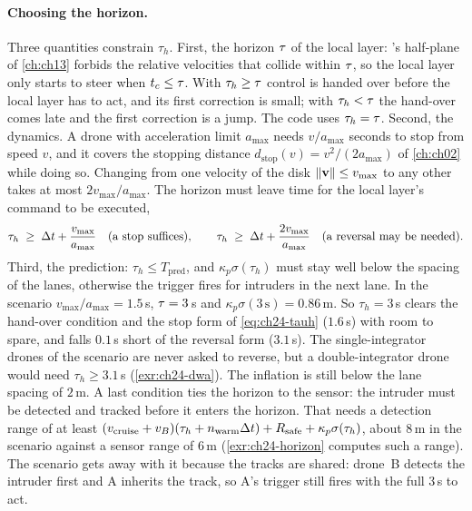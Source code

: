 \paragraph{Choosing the horizon.}
Three quantities constrain $\tau_h$. First, the horizon $\tau$ of the local
layer: \orca's half-plane of \cref{ch:ch13} forbids the relative velocities
that collide within $\tau$, so the local layer only starts to steer when
$t_c \le \tau$. With $\tau_h \ge \tau$ control is handed over before the
local layer has to act, and its first correction is small; with
$\tau_h < \tau$ the hand-over comes late and the first correction is a jump.
The code uses $\tau_h = \tau$. Second, the dynamics. A drone with
acceleration limit $a_{\max}$ needs $v/a_{\max}$ seconds to stop from speed
$v$, and it covers the stopping distance
$d_{\mathrm{stop}}(v) = v^2/(2a_{\max})$ of \cref{ch:ch02} while doing so.
Changing from one velocity of the disk
$\left\lVert \mathbf{v} \right\rVert \le v_{\max}$ to any other takes at most $2v_{\max}/a_{\max}$.
The horizon must leave time for the local layer's command to be executed,
\begin{equation}
  \tau_h \;\ge\; \Delta t + \frac{v_{\max}}{a_{\max}}
  \quad\text{(a stop suffices)},\qquad
  \tau_h \;\ge\; \Delta t + \frac{2v_{\max}}{a_{\max}}
  \quad\text{(a reversal may be needed)}.
  \label{eq:ch24-tauh}
\end{equation}
Third, the prediction: $\tau_h \le T_{\mathrm{pred}}$, and
$\kappa_p\sigma(\tau_h)$ must stay well below the spacing of the lanes,
otherwise the trigger fires for intruders in the next lane. In the scenario
$v_{\max}/a_{\max} = 1.5$\,s, $\tau = 3$\,s and $\kappa_p\sigma(3\,\mathrm{s})
= 0.86$\,m. So $\tau_h = 3$\,s clears the hand-over condition and the stop form of
\cref{eq:ch24-tauh} ($1.6$\,s) with room to spare, and falls $0.1$\,s short
of the reversal form ($3.1$\,s). The single-integrator drones of the
scenario are never asked to reverse, but a double-integrator drone would
need $\tau_h \ge 3.1$\,s (\cref{exr:ch24-dwa}). The inflation is still
below the lane spacing of $2$\,m. A last condition ties
the horizon to the sensor: the intruder must be detected and tracked before
it enters the horizon. That needs a detection range of at least
$(v_{\mathrm{cruise}} + v_B)(\tau_h + n_{\mathrm{warm}}\Delta t) + R_{\mathrm{safe}} + \kappa_p\sigma(\tau_h)$,
about $8$\,m in the scenario against a sensor range of $6$\,m
(\cref{exr:ch24-horizon} computes such a range). The scenario gets away with
it because the tracks are shared: drone~B detects the intruder first and A
inherits the track, so A's trigger still fires with the full $3$\,s to act.

